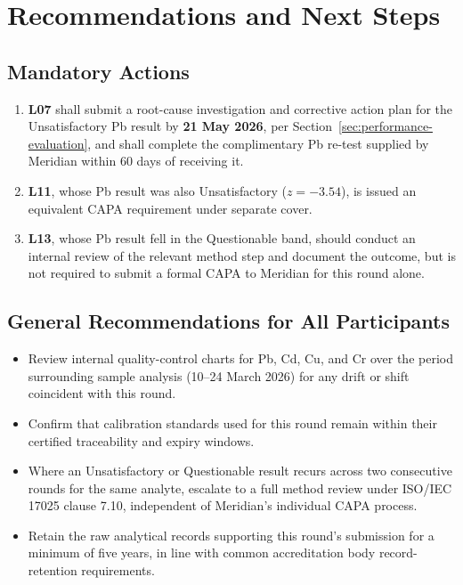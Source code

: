 \section{Recommendations and Next Steps}
\label{sec:recommendations}

\subsection{Mandatory Actions}
\begin{enumerate}
  \item \textbf{L07} shall submit a root-cause investigation and corrective action plan for the
        Unsatisfactory Pb result by \textbf{21 May 2026}, per Section~\ref{sec:performance-evaluation},
        and shall complete the complimentary Pb re-test supplied by Meridian within 60 days of
        receiving it.
  \item \textbf{L11}, whose Pb result was also Unsatisfactory (\(z=-3.54\)), is issued an
        equivalent CAPA requirement under separate cover.
  \item \textbf{L13}, whose Pb result fell in the Questionable band, should conduct an internal
        review of the relevant method step and document the outcome, but is not required to
        submit a formal CAPA to Meridian for this round alone.
\end{enumerate}

\subsection{General Recommendations for All Participants}
\begin{itemize}
  \item Review internal quality-control charts for Pb, Cd, Cu, and Cr over the period surrounding
        sample analysis (10--24 March 2026) for any drift or shift coincident with this round.
  \item Confirm that calibration standards used for this round remain within their certified
        traceability and expiry windows.
  \item Where an Unsatisfactory or Questionable result recurs across two consecutive rounds for
        the same analyte, escalate to a full method review under ISO/IEC 17025 clause 7.10,
        independent of Meridian's individual CAPA process.
  \item Retain the raw analytical records supporting this round's submission for a minimum of
        five years, in line with common accreditation body record-retention requirements.
\end{itemize}

